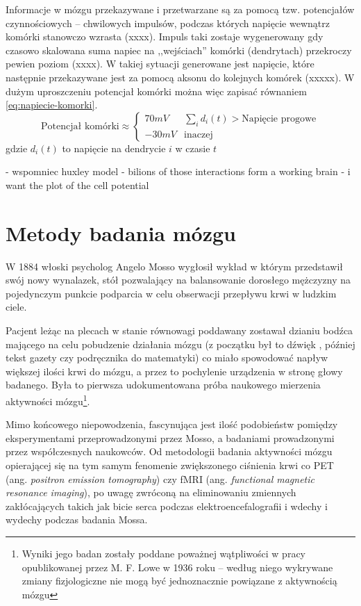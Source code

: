 \documentclass{./assets/wfis}
\begin{document}
Informacje w mózgu przekazywane i przetwarzane są za pomocą tzw. potencjałów czynnościowych – chwilowych impulsów, podczas których napięcie wewnątrz komórki stanowczo wzrasta (xxxx). Impuls taki zostaje wygenerowany gdy czasowo skalowana suma napiec na ,,wejściach'' komórki (dendrytach) przekroczy pewien poziom (xxxx). W takiej sytuacji generowane jest napięcie, które następnie przekazywane jest za pomocą aksonu do kolejnych komórek (xxxxx). W dużym uproszczeniu potencjał komórki można więc zapisać równaniem \ref{eq:napiecie-komorki}.
\begin{equation}\label{eq:napiecie-komorki}
    \text{Potencjał komórki} \approx 
    \begin{cases} 
      70mV & \sum_i d_i(t) > \text{Napięcie progowe}  \\
      -30mV &  \text{inaczej}
   \end{cases}
\end{equation}
gdzie $d_i(t)$ to napięcie na dendrycie $i$ w czasie $t$

- wspomniec huxley model
- bilions of those interactions form a working brain
- i want the plot of the cell potential

\section{Metody badania mózgu}
W 1884 włoski psycholog Angelo Mosso wygłosił wykład \cite{sandrone_weighing_2014} w którym przedstawił swój nowy wynalazek, stół pozwalający na balansowanie dorosłego mężczyzny na pojedynczym punkcie podparcia w celu obserwacji przepływu krwi w ludzkim ciele. 

Pacjent leżąc na plecach w stanie równowagi poddawany zostawał dzianiu bodźca mającego na celu pobudzenie działania mózgu (z początku był to dźwięk , później tekst gazety czy podręcznika do matematyki\cite{sandrone_weighing_2014}) co miało spowodować napływ większej ilości krwi do mózgu, a przez to pochylenie urządzenia w stronę głowy badanego. Była to pierwsza udokumentowana próba naukowego mierzenia aktywności mózgu\footnote{Wyniki jego badan zostały poddane poważnej wątpliwości w pracy opublikowanej przez M. F. Lowe \cite{lowe_application_1936} w 1936 roku – według niego wykrywane zmiany fizjologiczne nie mogą być jednoznacznie powiązane z aktywnością mózgu}.

Mimo końcowego niepowodzenia, fascynująca jest ilość podobieństw pomiędzy eksperymentami przeprowadzonymi przez Mosso, a badaniami prowadzonymi przez współczesnych naukowców. Od metodologii badania aktywności mózgu opierającej się na tym samym fenomenie zwiększonego ciśnienia krwi co PET (ang. \textit{positron emission tomography}) czy fMRI (ang. \textit{functional magnetic resonance imaging}), po uwagę zwróconą na eliminowaniu zmiennych zakłócających takich jak bicie serca podczas elektroencefalografii i wdechy i wydechy podczas badania Mossa.
\end{document}
